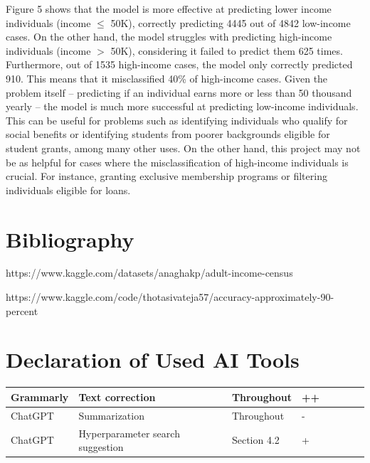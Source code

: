 \documentclass[a4paper,oneside,bibliography=totoc]{scrbook}
\begin{document}
Figure 5 shows that the model is more effective at predicting lower income individuals (income $\leq$ 50K), correctly predicting 4445 out of 4842 low-income cases. On the other hand, the model struggles with predicting high-income individuals (income $>$ 50K), considering it failed to predict them 625 times. Furthermore, out of 1535 high-income cases, the model only correctly predicted 910. This means that it misclassified 40\% of high-income cases. Given the problem itself – predicting if an individual earns more or less than 50 thousand yearly – the model is much more successful at predicting low-income individuals. This can be useful for problems such as identifying individuals who qualify for social benefits or identifying students from poorer backgrounds eligible for student grants, among many other uses. On the other hand, this project may not be as helpful for cases where the misclassification of high-income individuals is crucial. For instance, granting exclusive membership programs or filtering individuals eligible for loans.

\newpage

\section*{Bibliography}


\begin{enumerate}[label={[}\arabic*{]}.]
	\item https://www.kaggle.com/datasets/anaghakp/adult-income-census
	\item https://www.kaggle.com/code/thotasivateja57/accuracy-approximately-90-percent
\end{enumerate} 


\section*{Declaration of Used AI Tools}

\begin{tabular}{|l|l|l|l|l|l|l|l|}
	\hline Grammarly & Text correction &  Throughout &  ++  \\
	\hline ChatGPT & Summarization &  Throughout &  -   \\
	\hline ChatGPT & Hyperparameter search suggestion &  Section 4.2 & +  \\
	\hline
\end{tabular}
\end{document}
